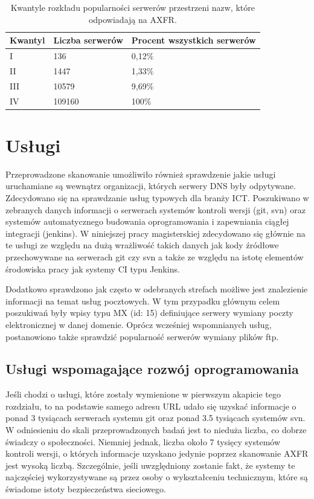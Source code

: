 \begin{table}[h]
	\centering
	\begin{tabular}{|p{}|p{}|p{}|}
	\hline
	\textbf{Kwantyl} &
	\textbf{Liczba serwerów} &
	\textbf{Procent wszystkich serwerów} \\
	\hline\hline
	I & 136 & 0,12\% \\
	II & 1447 & 1,33\% \\
	III & 10579 & 9,69\% \\
	IV & 109160 & 100\% \\
	\hline
	\end{tabular}
	\caption{Kwantyle rozkładu popularności serwerów przestrzeni nazw, które odpowiadają na AXFR.}
	\label{tab_cdf_ns}
\end{table}

\section{Usługi}
\noindent Przeprowadzone skanowanie umożliwiło również sprawdzenie jakie usługi uruchamiane są wewnątrz organizacji, których serwery DNS
były odpytywane. Zdecydowano się na sprawdzanie usług typowych dla branży ICT. Poszukiwano w zebranych danych informacji o serwerach
systemów kontroli wersji (git, svn) oraz systemów automatycznego budowania oprogramowania i zapewniania ciągłej integracji (jenkins).
W niniejszej pracy magisterskiej zdecydowano się głównie na te usługi ze względu na dużą wrażliwość takich danych jak kody źródłowe
przechowywane na serwerach git czy svn a także ze względu na istotę elementów środowiska pracy jak systemy CI typu Jenkins.

Dodatkowo sprawdzono jak często w odebranych strefach możliwe jest znalezienie informacji na temat usług pocztowych. W tym przypadku
głównym celem poszukiwań były wpisy typu MX (id: 15) definiujące serwery wymiany poczty elektronicznej w danej domenie. Oprócz
wcześniej wspomnianych usług, postanowiono także sprawdzić popularność serwerów wymiany plików ftp.

\subsection{Usługi wspomagające rozwój oprogramowania}
\noindent Jeśli chodzi o usługi, które zostały wymienione w pierwszym akapicie tego rozdziału, to na podstawie samego adresu URL udało się
uzyskać informacje o ponad 3 tysiącach serwerach systemu git oraz ponad 3.5 tysiącach systemów svn. W odniesieniu do skali
przeprowadzonych badań jest to nieduża liczba, co dobrze świadczy o społeczności. Niemniej jednak, liczba około 7 tysięcy systemów
kontroli wersji, o których informacje uzyskano jedynie poprzez skanowanie AXFR jest wysoką liczbą. Szczególnie, jeśli uwzględniony
zostanie fakt, że systemy te najczęściej wykorzystywane są przez osoby o wykształceniu technicznym, które są świadome istoty
bezpieczeństwa sieciowego.

